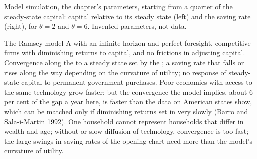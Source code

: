 \begin{omfigure}

{\small Model simulation, the chapter's parameters, starting from a quarter of the steady-state capital: capital relative to
its steady state (left) and the saving rate (right), for $\theta = 2$ and $\theta = 6$. Invented parameters, not data.}
\end{omfigure}

\begin{model}{The Ramsey model}
\assumes A  with an infinite horizon and perfect foresight, competitive firms with diminishing
returns to capital, and no frictions in adjusting capital.
\predicts Convergence along the  to a steady state set by the ; a saving rate that falls or
rises along the way depending on the curvature of utility; no response of steady-state capital to permanent government
purchases.
\tested Poor economies with access to the same technology grow faster; but the convergence the model implies, about 6
per cent of the gap a year here, is faster than the data on American states show, which can be matched only if
diminishing returns set in very slowly (Barro and Sala-i-Martin 1992).
\breaks One household cannot represent households that differ in wealth and age; without  or slow
diffusion of technology, convergence is too fast; the large swings in saving rates of the opening chart need more than
the model's curvature of utility.
\end{model}

